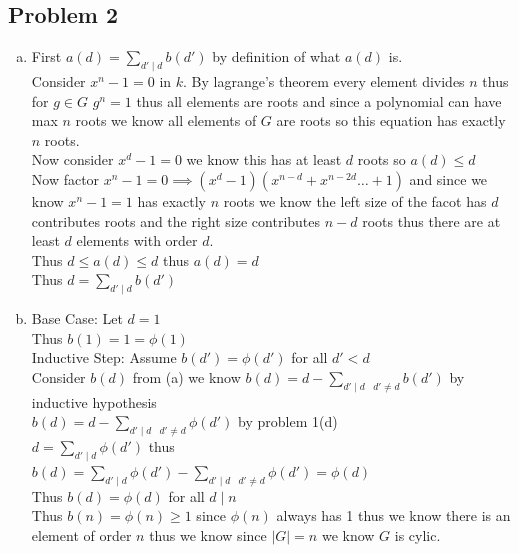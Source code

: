 \documentclass[12pt,letterpaper]{article}
\theoremstyle{definition}
\begin{document}
\subsection*{Problem 2}
\begin{enumerate}[(a)]
    \item First $a(d)=\sum\limits_{d' \mid d}b(d')$ by definition of what $a(d)$ is.\\
    Consider $x^n-1=0$ in $k$. By lagrange's theorem every element divides $n$ thus for $g \in G$ $g^n=1$ thus all elements are roots and since a polynomial can have max $n$ roots we know all elements of $G$ are roots so this equation has exactly $n$ roots.\\
    Now consider $x^d-1=0$ we know this has at least $d$ roots so $a(d)\leq d$\\
    Now factor $x^n-1=0 \implies (x^d -1)(x^{n-d} + x^{n-2d} \dots + 1)$ and since we know $x^n-1=1$ has exactly $n$ roots we know the left size of the facot has $d$ contributes roots and the right size contributes $n-d$ roots thus there are at least $d$ elements with order $d$.\\
    Thus $d \leq a(d) \leq d$ thus $a(d)=d$\\
    Thus $d=\sum\limits_{d' \mid d}b(d')$
    \item Base Case: Let $d=1$\\
    Thus $b(1)=1=\phi(1)$\\
    Inductive Step: Assume $b(d')=\phi(d')$ for all $d' < d$\\
    Consider $b(d)$ from (a) we know $b(d)=d-\sum\limits_{{d' \mid d\;\;\;d' \neq d}}b(d')$ by inductive hypothesis\\
    $b(d)=d-\sum\limits_{{d' \mid d\;\;\;d' \neq d}}\phi(d')$ by problem 1(d)\\
    $d=\sum\limits_{d' \mid d}\phi(d')$ thus\\
    $b(d)=\sum\limits_{d' \mid d}\phi(d')-\sum\limits_{{d' \mid d\;\;\;d' \neq d}}\phi(d')=\phi(d)$\\
    Thus $b(d)=\phi(d)$ for all $d \mid n$\\
    Thus $b(n)=\phi(n)\geq 1$ since $\phi(n)$ always has 1 thus we know there is an element of order $n$ thus we know since $|G|=n$ we know $G$ is cylic.
\end{enumerate}

\newpage
\end{document}
